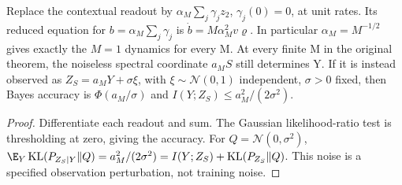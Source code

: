 \begin{proposition}
\label{prop:astra_serial_control}
Replace the contextual readout by $\alpha_M\sum_j\gamma_jz_2$,
$\gamma_j(0)=0$, at unit rates. Its reduced equation for
$b=\alpha_M\sum_j\gamma_j$ is $\dot b=M\alpha_M^2v\varrho$.
In particular $\alpha_M=M^{-1/2}$ gives exactly the $M=1$ dynamics
for every M. At every finite M in the original theorem, the noiseless
spectral coordinate $a_MS$ still determines Y. If it is instead
observed as $Z_S=a_MY+\sigma\xi$, with $\xi\sim\mathcal N(0,1)$
independent, $\sigma>0$ fixed, then Bayes accuracy is
$\Phi(a_M/\sigma)$ and $I(Y;Z_S)\le a_M^2/(2\sigma^2)$.
\end{proposition}
\begin{proof}
Differentiate each readout and sum. The Gaussian likelihood-ratio test
is thresholding at zero, giving the accuracy. For
$Q=\mathcal N(0,\sigma^2)$,
$\E_Y\operatorname{KL}(P_{Z_S|Y}\|Q)=a_M^2/(2\sigma^2)
=I(Y;Z_S)+\operatorname{KL}(P_{Z_S}\|Q)$.
This noise is a specified observation perturbation, not training noise.
\end{proof}

